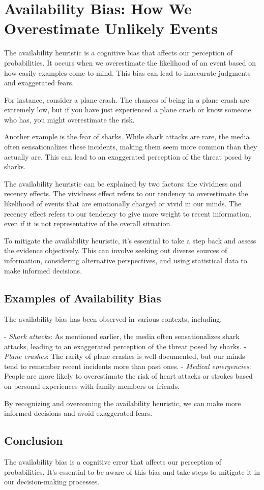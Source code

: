 \chapter{Availability Bias: How We Overestimate Unlikely Events}

The availability heuristic is a cognitive bias that affects our perception of probabilities. It occurs when we overestimate the likelihood of an event based on how easily examples come to mind. This bias can lead to inaccurate judgments and exaggerated fears.

For instance, consider a plane crash. The chances of being in a plane crash are extremely low, but if you have just experienced a plane crash or know someone who has, you might overestimate the risk.

Another example is the fear of sharks. While shark attacks are rare, the media often sensationalizes these incidents, making them seem more common than they actually are. This can lead to an exaggerated perception of the threat posed by sharks.

The availability heuristic can be explained by two factors: the vividness and recency effects. The vividness effect refers to our tendency to overestimate the likelihood of events that are emotionally charged or vivid in our minds. The recency effect refers to our tendency to give more weight to recent information, even if it is not representative of the overall situation.

To mitigate the availability heuristic, it's essential to take a step back and assess the evidence objectively. This can involve seeking out diverse sources of information, considering alternative perspectives, and using statistical data to make informed decisions.

\section{Examples of Availability Bias}

The availability bias has been observed in various contexts, including:

- \emph{Shark attacks}: As mentioned earlier, the media often sensationalizes shark attacks, leading to an exaggerated perception of the threat posed by sharks.
- \emph{Plane crashes}: The rarity of plane crashes is well-documented, but our minds tend to remember recent incidents more than past ones.
- \emph{Medical emergencies}: People are more likely to overestimate the risk of heart attacks or strokes based on personal experiences with family members or friends.

By recognizing and overcoming the availability heuristic, we can make more informed decisions and avoid exaggerated fears.

\section{Conclusion}

The availability bias is a cognitive error that affects our perception of probabilities. It's essential to be aware of this bias and take steps to mitigate it in our decision-making processes.
